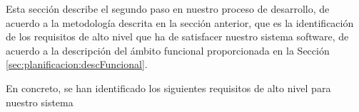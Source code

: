 Esta sección describe el segundo paso en nuestro proceso de desarrollo, de acuerdo a la metodología descrita en la sección anterior, que es la identificación de los requisitos de alto nivel que ha de satisfacer nuestro sistema software, de acuerdo a la descripción del ámbito funcional proporcionada en la Sección~ \ref{sec:planificacion:descFuncional}.
\newline
%
%
%
%
%
%
%

En concreto, se han identificado los siguientes requisitos de alto nivel para nuestro sistema


